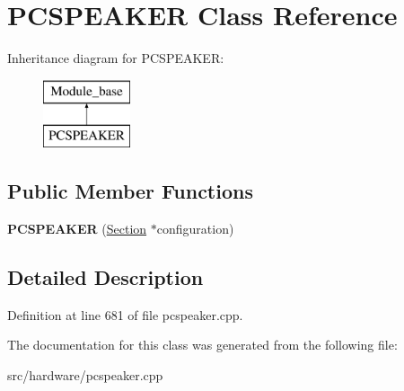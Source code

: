 \hypertarget{classPCSPEAKER}{\section{P\-C\-S\-P\-E\-A\-K\-E\-R Class Reference}
\label{classPCSPEAKER}
}
Inheritance diagram for P\-C\-S\-P\-E\-A\-K\-E\-R\-:\begin{figure}[H]
\begin{center}
\leavevmode
\includegraphics[height=2.000000cm]{classPCSPEAKER}
\end{center}
\end{figure}
\subsection*{Public Member Functions}
\begin{DoxyCompactItemize}
\item 
\hypertarget{classPCSPEAKER_a7c610f8af87ac405537da150878488aa}{{\bfseries P\-C\-S\-P\-E\-A\-K\-E\-R} (\hyperlink{classSection}{Section} $\ast$configuration)}\label{classPCSPEAKER_a7c610f8af87ac405537da150878488aa}

\end{DoxyCompactItemize}


\subsection{Detailed Description}


Definition at line 681 of file pcspeaker.\-cpp.



The documentation for this class was generated from the following file\-:\begin{DoxyCompactItemize}
\item 
src/hardware/pcspeaker.\-cpp\end{DoxyCompactItemize}
